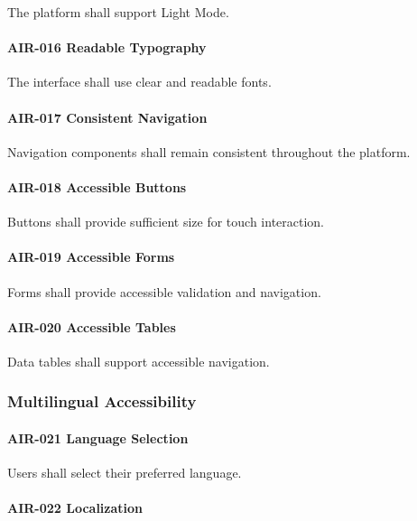 The platform shall support Light Mode.

\paragraph{AIR-016 Readable Typography}

The interface shall use clear and readable fonts.

\paragraph{AIR-017 Consistent Navigation}

Navigation components shall remain consistent throughout the platform.

\paragraph{AIR-018 Accessible Buttons}

Buttons shall provide sufficient size for touch interaction.

\paragraph{AIR-019 Accessible Forms}

Forms shall provide accessible validation and navigation.

\paragraph{AIR-020 Accessible Tables}

Data tables shall support accessible navigation.


\subsubsection*{Multilingual Accessibility}

\paragraph{AIR-021 Language Selection}

Users shall select their preferred language.

\paragraph{AIR-022 Localization}

